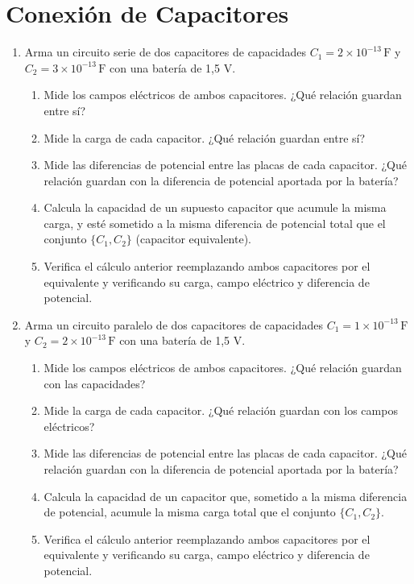 \documentclass[12pt]{report}
\begin{document}
\section{Conexión de Capacitores}

\begin{enumerate}
    \item Arma un circuito serie de dos capacitores de capacidades $C_1 = 2 \times 10^{-13} \, \text{F}$ y $C_2 = 3 \times 10^{-13} \, \text{F}$ con una batería de 1,5 V.
    \begin{enumerate}
        \item Mide los campos eléctricos de ambos capacitores. ¿Qué relación guardan entre sí?
        \item Mide la carga de cada capacitor. ¿Qué relación guardan entre sí?
        \item Mide las diferencias de potencial entre las placas de cada capacitor. ¿Qué relación guardan con la diferencia de potencial aportada por la batería?
        \item Calcula la capacidad de un supuesto capacitor que acumule la misma carga, y esté sometido a la misma diferencia de potencial total que el conjunto $\{C_1, C_2\}$ (capacitor equivalente).
        \item Verifica el cálculo anterior reemplazando ambos capacitores por el equivalente y verificando su carga, campo eléctrico y diferencia de potencial.
    \end{enumerate}
    
    \item Arma un circuito paralelo de dos capacitores de capacidades $C_1 = 1 \times 10^{-13} \, \text{F}$ y $C_2 = 2 \times 10^{-13} \, \text{F}$ con una batería de 1,5 V.
    \begin{enumerate}
        \item Mide los campos eléctricos de ambos capacitores. ¿Qué relación guardan con las capacidades?
        \item Mide la carga de cada capacitor. ¿Qué relación guardan con los campos eléctricos?
        \item Mide las diferencias de potencial entre las placas de cada capacitor. ¿Qué relación guardan con la diferencia de potencial aportada por la batería?
        \item Calcula la capacidad de un capacitor que, sometido a la misma diferencia de potencial, acumule la misma carga total que el conjunto $\{C_1, C_2\}$.
        \item Verifica el cálculo anterior reemplazando ambos capacitores por el equivalente y verificando su carga, campo eléctrico y diferencia de potencial.
    \end{enumerate}
\end{enumerate}
\end{document}
